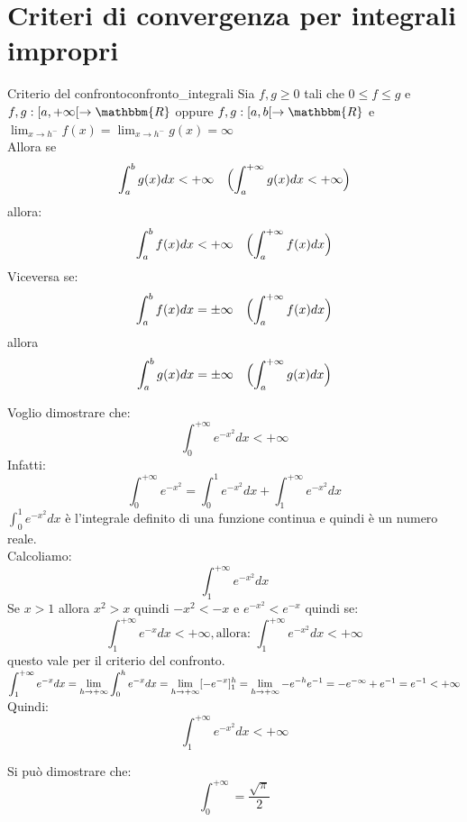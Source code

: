 \documentclass[12pt]{report}
\newcounter{theorem}
\newcommand{\nmu}{}
\begin{document}
		\section{Criteri di convergenza per integrali impropri}
		\begin{theorem}{\nmu Criterio del confronto}{confronto_integrali}
			Sia $f, g \geq 0$ tali che $ 0 \leq f \leq g$ e $f, g:[a, +\infty[ \to \mathbbm{R}$ oppure $f,g: [a, b[ \to \mathbbm{R}$ e $\lim_{x \to h^-}f(x) = \lim_{x \to h^-}g(x) = \infty$ \\
			Allora se
			\[
			\int_{a}^{b}g(x)dx < +\infty \quad \Bigl( \int_{a}^{+\infty}g(x)dx < +\infty\Bigr)
			\]
			allora:
			\[
			\int_{a}^{b}f(x)dx < +\infty \quad \Bigl(\int_{a}^{+\infty}f(x)dx\Bigr)
			\]
			Viceversa se:
			\[
			\int_{a}^{b}f(x)dx = \pm\infty \quad \Bigl(\int_{a}^{+\infty}f(x)dx\Bigr)
			\]
			allora
			\[
			\int_{a}^{b}g(x)dx = \pm\infty \quad \Bigl(\int_{a}^{+\infty}g(x)dx\Bigr)
			\]
		\end{theorem}
		\begin{example}{}{}
			Voglio dimostrare che:
			\[
			\int_{0}^{+\infty}e^{-x^2}dx < +\infty
			\]
			Infatti:
			\[
			\int_{0}^{+\infty}e^{-x^2} = \int_{0}^{1}e^{-x^2}dx + \int_{1}^{+\infty}e^{-x^2}dx
			\]
			$\int_{0}^{1}e^{-x^2}dx$ è l'integrale definito di una funzione continua e quindi è un numero reale. \\
			Calcoliamo:
			\[
			\int_{1}^{+\infty}e^{-x^2}dx
			\]
			Se $x > 1$ allora $x^2>x$ quindi $-x^2 < -x$ e $e^{-x^2} < e^{-x}$ quindi se:
			\[
			\int_{1}^{+\infty}e^{-x}dx < +\infty, \text{allora: } \int_{1}^{+\infty}e^{-x^2}dx < +\infty
			\]
			questo vale per il criterio del confronto. \\
			$\mathlarger{\int_{1}^{+\infty}e^{-x}dx = \lim_{h \to +\infty}\int_{0}^{h}e^{-x}dx = \lim_{h \to +\infty}[-e^{-x}]^h_1 = \lim_{h \to +\infty}-e^{-h} e^{-1}} = -e^{-\infty} + e^{-1} = e^{-1} < +\infty$ \\
			Quindi:
			\[
			\int_{1}^{+\infty}e^{-x^2}dx < +\infty
			\]
			\begin{note}{}{}
				Si può dimostrare che:
				\[
				\int_{0}^{+\infty} = \frac{\sqrt{\pi}}{2}
				\]
			\end{note}
		\end{example}
\end{document}
